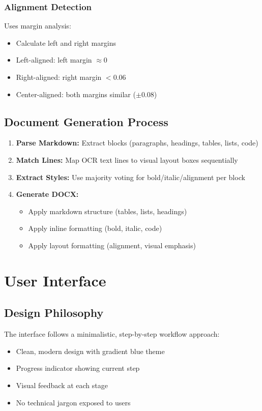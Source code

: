 \documentclass[12pt,a4paper]{article}
\begin{document}
\subsubsection{Alignment Detection}
Uses margin analysis:
\begin{itemize}[noitemsep]
    \item Calculate left and right margins
    \item Left-aligned: left margin $\approx 0$
    \item Right-aligned: right margin $< 0.06$
    \item Center-aligned: both margins similar ($\pm 0.08$)
\end{itemize}

\subsection{Document Generation Process}
\begin{enumerate}
    \item \textbf{Parse Markdown:} Extract blocks (paragraphs, headings, tables, lists, code)
    \item \textbf{Match Lines:} Map OCR text lines to visual layout boxes sequentially
    \item \textbf{Extract Styles:} Use majority voting for bold/italic/alignment per block
    \item \textbf{Generate DOCX:}
    \begin{itemize}
        \item Apply markdown structure (tables, lists, headings)
        \item Apply inline formatting (bold, italic, code)
        \item Apply layout formatting (alignment, visual emphasis)
    \end{itemize}
\end{enumerate}

\newpage

\section{User Interface}

\subsection{Design Philosophy}
The interface follows a minimalistic, step-by-step workflow approach:
\begin{itemize}[noitemsep]
    \item Clean, modern design with gradient blue theme
    \item Progress indicator showing current step
    \item Visual feedback at each stage
    \item No technical jargon exposed to users
\end{itemize}
\end{document}

